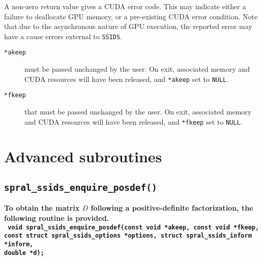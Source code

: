 \noindent
A non-zero return value gives a CUDA error code. This may indicate either
a failure to deallocate GPU memory, or a pre-existing CUDA error condition.
Note that due to the asynchronous nature of GPU execution, the
reported error may have a cause errors external to {\tt SSIDS}.

\begin{description}

\item[\texttt{*akeep}] must be passed unchanged by the user.
On exit, associated memory and CUDA resources will have been released, and
\texttt{*akeep} set to \texttt{NULL}.

\item[\texttt{*fkeep}] that must be passed unchanged by the user.
On exit, associated memory and CUDA resources will have been released, and
\texttt{*fkeep} set to \texttt{NULL}.

\end{description}

\section{Advanced subroutines}


\subsection{\texttt{spral\_ssids\_enquire\_posdef()}}
\textbf{To obtain the matrix $D$ following a positive-definite factorization, the following routine is provided.
   \vspace*{0.1cm} \\
   \texttt{
      \hspace*{0.2cm} void spral\_ssids\_enquire\_posdef(const void *akeep, const void *fkeep, \\
      \hspace*{0.7cm} const struct spral\_ssids\_options *options,
         struct spral\_ssids\_inform *inform, \\
      \hspace*{0.7cm} double *d);
   }
}

